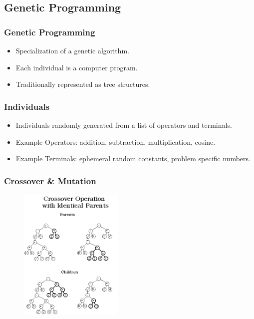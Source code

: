 \documentclass{beamer}
\begin{document}
\subsection{Genetic Programming}

\begin{frame}

	\frametitle{Genetic Programming}

	\begin{itemize}
		\item Specialization of a genetic algorithm.
		\item Each individual is a computer program.
		\item Traditionally represented as tree structures.
	\end{itemize}

\end{frame}

\begin{frame}

	\frametitle{Individuals}

	\begin{itemize}
		\item Individuals randomly generated from a list of operators and terminals.
		\item Example Operators: addition, subtraction, multiplication, cosine.
		\item Example Terminals: ephemeral random constants, problem specific numbers.
	\end{itemize}

\end{frame}

\begin{frame}
	\frametitle{Crossover \& Mutation}
	\begin{figure}
		\includegraphics[width=50mm ]{resources/gp-crossover.png}
	\end{figure}

\end{frame}
\end{document}
